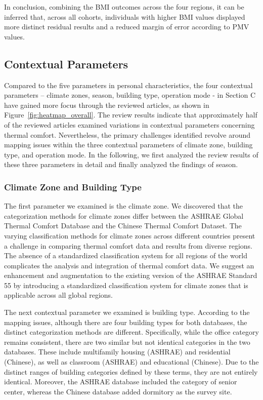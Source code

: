 \documentclass[final,3p,times,12pt]{elsarticle}
\begin{document}
In conclusion, combining the BMI outcomes across the four regions, it can be inferred that, across all cohorts, individuals with higher BMI values displayed more distinct residual results and a reduced margin of error according to PMV values.

\subsection{Contextual Parameters}
\label{subsec1}

Compared to the five parameters in personal characteristics, the four contextual parameters – climate zones, season, building type, operation mode - in Section C have gained more focus through the reviewed articles, as shown in Figure~\ref{fig:heatmap_overall}. The review results indicate that approximately half of the reviewed articles examined variations in contextual parameters concerning thermal comfort. Nevertheless, the primary challenges identified revolve around mapping issues within the three contextual parameters of climate zone, building type, and operation mode. In the following, we first analyzed the review results of these three parameters in detail and finally analyzed the findings of season.

\subsubsection{Climate Zone and Building Type}

The first parameter we examined is the climate zone. We discovered that the categorization methods for climate zones differ between the ASHRAE Global Thermal Comfort Database and the Chinese Thermal Comfort Dataset. The varying classification methods for climate zones across different countries present a challenge in comparing thermal comfort data and results from diverse regions. The absence of a standardized classification system for all regions of the world complicates the analysis and integration of thermal comfort data. We suggest an enhancement and augmentation to the existing version of the ASHRAE Standard 55 by introducing a standardized classification system for climate zones that is applicable across all global regions.

The next contextual parameter we examined is building type. According to the mapping issues, although there are four building types for both databases, the distinct categorization methods are different. Specifically, while the office category remains consistent, there are two similar but not identical categories in the two databases. These include multifamily housing (ASHRAE) and residential (Chinese), as well as classroom (ASHRAE) and educational (Chinese). Due to the distinct ranges of building categories defined by these terms, they are not entirely identical. Moreover, the ASHRAE database included the category of senior center, whereas the Chinese database added dormitory as the survey site. 
\end{document}
